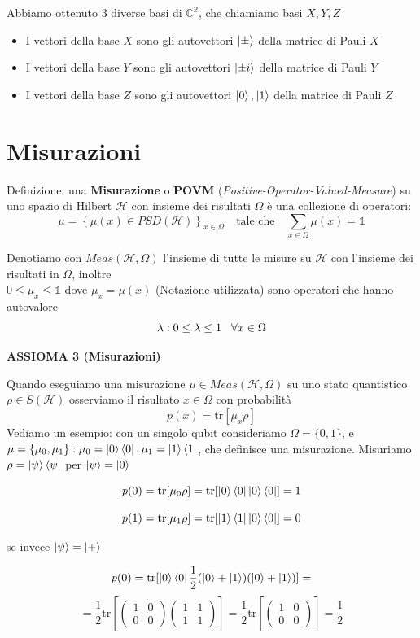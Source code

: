 \documentclass{report}
\begin{document}
Abbiamo ottenuto 3 diverse basi di $\mathbb{C^2}$, che chiamiamo basi $X,Y,Z$
\begin{itemize}
    \item I vettori della base $X$ sono gli autovettori $\ket{\pm}$ della matrice di Pauli $X$
    \item I vettori della base $Y$ sono gli autovettori $\ket{\pm i}$ della matrice di Pauli $Y$
    \item I vettori della base $Z$ sono gli autovettori $\ket{0},\ket{1}$ della matrice di Pauli $Z$
\end{itemize}

\section{Misurazioni}
Definizione: una \textbf{Misurazione} o \textbf{POVM} (\textit{Positive-Operator-Valued-Measure}) su uno spazio di Hilbert $\mathcal{H}$ con insieme dei risultati $\Omega$ è una collezione di operatori:
$$\mu=\left\{ \mu(x) \in \textit{PSD}(\mathcal{H}) \right\}_{x\in\Omega}\quad \text{tale che}\quad \sum_{x\in\Omega} \mu(x) = \mathbb{1}$$

Denotiamo con $\textit{Meas}(\mathcal{H},\Omega)$ l'insieme di tutte le misure su $\mathcal{H}$ con l'insieme dei risultati in $\Omega$, inoltre\\ $0\le\mu_x\le\mathbb{1}$ dove $\mu_x=\mu(x)$ 
(Notazione utilizzata) sono operatori che hanno autovalore $$\lambda:0\le\lambda\le1 \hspace{0.3cm} \forall x \in \Omega$$

\textbf{ASSIOMA 3 (Misurazioni)}

Quando eseguiamo una misurazione $\mu\in \textit{Meas}(\mathcal{H},\Omega)$ su uno stato quantistico $\rho\in S(\mathcal{H})$ osserviamo il risultato $x\in \Omega$ con probabilità $$p(x) = \text{tr}[\mu_x\rho]$$
Vediamo un esempio: con un singolo qubit consideriamo $\Omega= \{0,1\}$, e
$\mu=\{\mu_0,\mu_1\}:\mu_0=\ket{0}\bra{0},\mu_1=\ket{1}\bra{1}$, che definisce una misurazione. Misuriamo $\rho = \ket{\psi}\bra{\psi}$ per $\ket{\psi} = \ket{0}$

$$
    p(0)=\text{tr}[\mu_0\rho]=\text{tr}[\ket{0}\bra{0}\ket{0}\bra{0}] = 1
$$

$$
    p(1)=\text{tr}[\mu_1\rho]=\text{tr}[\ket{1}\bra{1}\ket{0}\bra{0}] = 0
$$

se invece $\ket{\psi} = \ket{+}$

$$
    p(0) = \text{tr}[\ket{0}\bra{0}\frac{1}{2}(\ket{0}+\ket{1})(\ket{0}+\ket{1})] = 
$$
$$
    = \frac{1}{2} \text{tr}\left[
    \begin{pmatrix}
        1 & 0\\
        0 & 0
    \end{pmatrix}
    \begin{pmatrix}
        1 & 1\\
        1 & 1
    \end{pmatrix}
    \right]
     = 
     \frac{1}{2} \text{tr}\left[
    \begin{pmatrix}
        1 & 0\\
        0 & 0
    \end{pmatrix}\right] = \frac{1}{2}
$$
\end{document}
